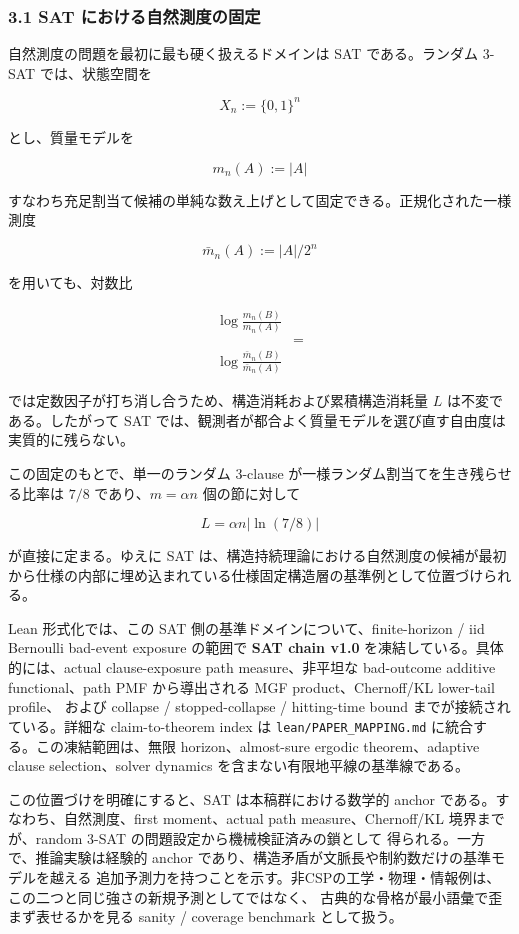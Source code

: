 \documentclass[12pt,a4paper]{article}
\begin{document}
\subsubsection{3.1 SAT における自然測度の固定}\label{sat-ux306bux304aux3051ux308bux81eaux7136ux6e2cux5ea6ux306eux56faux5b9a}

自然測度の問題を最初に最も硬く扱えるドメインは SAT である。ランダム 3-SAT では、状態空間を

\[
X_{n} := \{0,1\}^n
\]

とし、質量モデルを

\[
m_{n}(A) := |A|
\]

すなわち充足割当て候補の単純な数え上げとして固定できる。正規化された一様測度

\[
\bar m_{n}(A) := |A| / 2^n
\]

を用いても、対数比

\[
\begin{aligned}
\log \frac{m_{n}(B)}{m_{n}(A)} \\
&= \\
\log \frac{\bar m_{n}(B)}{\bar m_{n}(A)}
\end{aligned}
\]

では定数因子が打ち消し合うため、構造消耗および累積構造消耗量 \(L\) は不変である。したがって SAT では、観測者が都合よく質量モデルを選び直す自由度は実質的に残らない。

この固定のもとで、単一のランダム 3-clause が一様ランダム割当てを生き残らせる比率は \(7/8\) であり、\(m=\alpha n\) 個の節に対して

\[
L = \alpha n |\ln(7/8)|
\]

が直接に定まる。ゆえに SAT は、構造持続理論における自然測度の候補が最初から仕様の内部に埋め込まれている仕様固定構造層の基準例として位置づけられる。

Lean 形式化では、この SAT 側の基準ドメインについて、finite-horizon / iid Bernoulli bad-event exposure の範囲で \textbf{SAT chain v1.0} を凍結している。具体的には、actual clause-exposure path measure、非平坦な bad-outcome additive functional、path PMF から導出される MGF product、Chernoff/KL lower-tail profile、 および collapse / stopped-collapse / hitting-time bound までが接続されている。詳細な claim-to-theorem index は \texttt{lean/PAPER\_MAPPING.md} に統合する。この凍結範囲は、無限 horizon、almost-sure ergodic theorem、adaptive clause selection、solver dynamics を含まない有限地平線の基準線である。

この位置づけを明確にすると、SAT は本稿群における数学的 anchor である。すなわち、自然測度、first moment、actual path measure、Chernoff/KL 境界までが、random 3-SAT の問題設定から機械検証済みの鎖として 得られる。一方で、推論実験は経験的 anchor であり、構造矛盾が文脈長や制約数だけの基準モデルを越える 追加予測力を持つことを示す。非CSPの工学・物理・情報例は、この二つと同じ強さの新規予測としてではなく、 古典的な骨格が最小語彙で歪まず表せるかを見る sanity / coverage benchmark として扱う。
\end{document}
